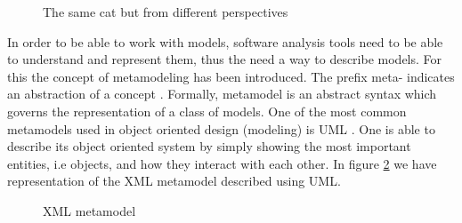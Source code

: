 \begin{figure}
\centering
{}
\caption{The same cat but from different perspectives \cite{figure:CatModel}
\label{fig:CatModel}}
\end{figure}	

	
	In order to be able to work with models, software analysis tools need to be
able to understand and represent them, thus the need a way to describe models. For
this the concept of metamodeling has been introduced. The prefix meta- indicates 
an abstraction of a concept \cite{wiki:meta}. Formally, metamodel is an abstract 
syntax which governs the representation of a class of models. One of the most
common metamodels used in object oriented design (modeling) is UML
\cite{book:UMLDistilled}. One is able to describe its object oriented system by
simply showing the most important entities, i.e objects, and how
they interact with each other. In  figure \ref{fig:umlMetamodel} we have
representation of the XML metamodel described using UML.

   \begin{figure}
		\centering
		\caption{XML metamodel\label{fig:umlMetamodel}}
	\end{figure}

